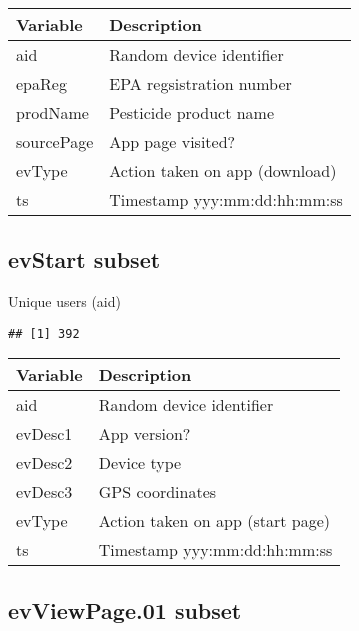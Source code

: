 \documentclass[
]{article}
\newenvironment{Shaded}{\begin{snugshade}}{\end{snugshade}}
\newcommand{\AttributeTok}[1]{\textcolor[rgb]{0.77,0.63,0.00}{#1}}
\newcommand{\FunctionTok}[1]{\textcolor[rgb]{0.00,0.00,0.00}{#1}}
\newcommand{\NormalTok}[1]{#1}
\newcommand{\SpecialCharTok}[1]{\textcolor[rgb]{0.00,0.00,0.00}{#1}}
\newcommand{\StringTok}[1]{\textcolor[rgb]{0.31,0.60,0.02}{#1}}
\begin{document}
\begin{longtable}[]{@{}ll@{}}
\toprule
Variable & Description \\
\midrule
\endhead
aid & Random device identifier \\
epaReg & EPA regsistration number \\
prodName & Pesticide product name \\
sourcePage & App page visited? \\
evType & Action taken on app (download) \\
ts & Timestamp yyy:mm:dd:hh:mm:ss \\
\bottomrule
\end{longtable}

\hypertarget{evstart-subset}{%
\subsection{evStart subset}\label{evstart-subset}}

Unique users (aid)

\begin{Shaded}
\end{Shaded}

\begin{verbatim}
## [1] 392
\end{verbatim}

\begin{longtable}[]{@{}ll@{}}
\toprule
Variable & Description \\
\midrule
\endhead
aid & Random device identifier \\
evDesc1 & App version? \\
evDesc2 & Device type \\
evDesc3 & GPS coordinates \\
evType & Action taken on app (start page) \\
ts & Timestamp yyy:mm:dd:hh:mm:ss \\
\bottomrule
\end{longtable}

\hypertarget{evviewpage.01-subset}{%
\subsection{evViewPage.01 subset}\label{evviewpage.01-subset}}
\end{document}
